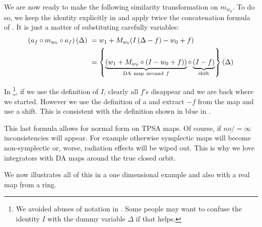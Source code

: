\documentclass{hitec}     %
\begin{document}
{{{{{We are now ready to make the following similarity transformation on ${m}_{{w}_{0}}$. To do so, we keep the identity explicitly in  and apply twice the  concatenation formula of . It is just a matter of substituting carefully variables:
%
\begin{subequations}\begin{align} \left({{a}_{f}\circ {m}_{{w}_{0}}\circ {a}_{f}}\right)\left({\Delta }\right)\  &={w}_{1}+{M}_{{w}_{0}}(I\left({\Delta -f}\right)-{w}_{0}+f) \label{eq:simil0}\\ \ &=\left\{{\underbrace{\left({{w}_{1}+{M}_{{w}_{0}}\circ (I-{w}_{0}+f)}\right)}\limits_{{\rm D}{\rm A}~{\rm m}{\rm a}{\rm p}~{\rm a}{\rm r}{\rm o}{\rm u}{\rm n}{\rm d} ~f}^{}\circ \underbrace{\left({I-f}\right)}\limits_{{\rm s}{\rm h}{\rm i}{\rm f}{\rm t}}^{}}\right\}\left({\Delta }\right)\label{eq:simil} \end{align}\end{subequations}


%
In \footnote{We avoided  abuses of notation in . Some people may want to confuse the identity $I$ with the dummy variable $\Delta$ if that helps.}, if we use the definition of $I$, clearly all  $f$'s disappear and we are back where we started. However we use the definition of a  and extract $-f$ from the map and use a shift. This is consistent with the definition shown in blue in .

This last formula allows for normal form on TPSA maps. Of course, if $no/=\infty$ inconsistencies will appear. For example otherwise symplectic maps will become non-symplectic or, worse, radiation effects will be wiped out. This is why we love integrators with DA maps around the true closed orbit.

We now illustrates all of this in a one dimensional example and also with a real map from a ring.

}}}}}
\end{document}
